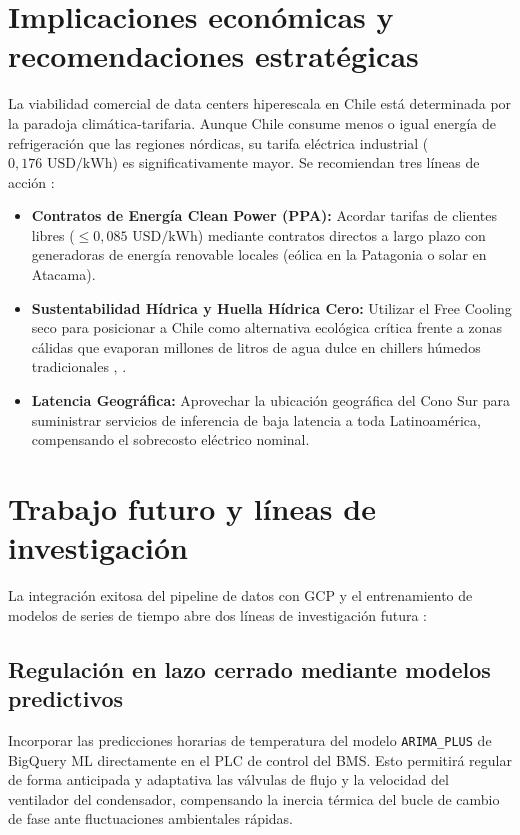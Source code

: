 \section{Implicaciones econ\'omicas y recomendaciones estrat\'egicas}
La viabilidad comercial de data centers hiperescala en Chile est\'a determinada por la paradoja clim\'atica-tarifaria. Aunque Chile consume menos o igual energ\'ia de refrigeraci\'on que las regiones n\'ordicas, su tarifa el\'ectrica industrial ($0,176\text{ USD/kWh}$) es significativamente mayor. Se recomiendan tres l\'ineas de acci\'on \cite{bnef2024}:
\begin{itemize}
    \item \textbf{Contratos de Energ\'ia Clean Power (PPA):} Acordar tarifas de clientes libres ($\le 0,085\text{ USD/kWh}$) mediante contratos directos a largo plazo con generadoras de energ\'ia renovable locales (e\'olica en la Patagonia o solar en Atacama).
    \item \textbf{Sustentabilidad H\'idrica y Huella H\'idrica Cero:} Utilizar el Free Cooling seco para posicionar a Chile como alternativa ecol\'ogica cr\'itica frente a zonas c\'alidas que evaporan millones de litros de agua dulce en chillers h\'umedos tradicionales \cite{greenberg2006}, \cite{greengrid2008}.
    \item \textbf{Latencia Geogr\'afica:} Aprovechar la ubicaci\'on geogr\'afica del Cono Sur para suministrar servicios de inferencia de baja latencia a toda Latinoam\'erica, compensando el sobrecosto el\'ectrico nominal.
\end{itemize}

\section{Trabajo futuro y l\'ineas de investigaci\'on}
La integraci\'on exitosa del pipeline de datos con GCP y el entrenamiento de modelos de series de tiempo abre dos l\'ineas de investigaci\'on futura \cite{google2023}:

\subsection{Regulaci\'on en lazo cerrado mediante modelos predictivos}
Incorporar las predicciones horarias de temperatura del modelo \texttt{ARIMA\_}\-\texttt{PLUS} de BigQuery ML directamente en el PLC de control del BMS. Esto permitir\'a regular de forma anticipada y adaptativa las v\'alvulas de flujo y la velocidad del ventilador del condensador, compensando la inercia t\'ermica del bucle de cambio de fase ante fluctuaciones ambientales r\'apidas.

